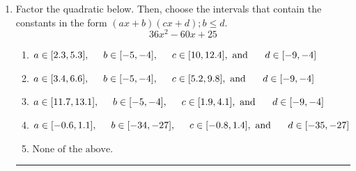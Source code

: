 \documentclass[14pt]{extbook}
\newcommand{\litem}[1]{\item#1\hspace*{-1cm}\rule{\textwidth}{0.4pt}}
\begin{document}
\begin{enumerate}
{\begin{enumerate}[label=\Alph*.]
\end{enumerate} }
\litem{
Factor the quadratic below. Then, choose the intervals that contain the constants in the form $(ax+b)(cx+d); b \leq d.$\[ 36x^{2} -60 x + 25 \]\begin{enumerate}[label=\Alph*.]
\item \( a \in [2.3, 5.3], \hspace*{5mm} b \in [-5, -4], \hspace*{5mm} c \in [10, 12.4], \text{ and } \hspace*{5mm} d \in [-9, -4] \)
\item \( a \in [3.4, 6.6], \hspace*{5mm} b \in [-5, -4], \hspace*{5mm} c \in [5.2, 9.8], \text{ and } \hspace*{5mm} d \in [-9, -4] \)
\item \( a \in [11.7, 13.1], \hspace*{5mm} b \in [-5, -4], \hspace*{5mm} c \in [1.9, 4.1], \text{ and } \hspace*{5mm} d \in [-9, -4] \)
\item \( a \in [-0.6, 1.1], \hspace*{5mm} b \in [-34, -27], \hspace*{5mm} c \in [-0.8, 1.4], \text{ and } \hspace*{5mm} d \in [-35, -27] \)
\item \( \text{None of the above.} \)


\end{enumerate}}
\end{enumerate}
\end{document}
